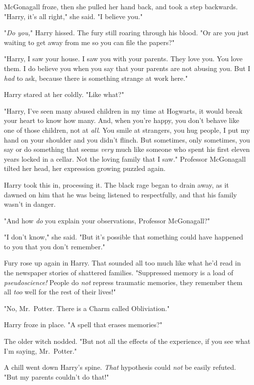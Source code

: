 McGonagall froze, then she pulled her hand back, and took a step backwards.
"Harry, it's all right," she said. "I believe you."

"\emph{Do you,}" Harry hissed. The fury still roaring through his blood. "Or
are you just waiting to get away from me so you can file the papers?"

"Harry, I saw your house. I saw you with your parents. They love you. You love
them. I do believe you when you say that your parents are not abusing you. But
I \emph{had} to ask, because there is something strange at work here."

Harry stared at her coldly. "Like what?"

"Harry, I've seen many abused children in my time at Hogwarts, it would break
your heart to know how many. And, when you're happy, you don't behave like one
of those children, not at \emph{all}. You smile at strangers, you hug people, I
put my hand on your shoulder and you didn't flinch. But sometimes, only
sometimes, you say or do something that seems \emph{very} much like{\el}
someone who spent his first eleven years locked in a cellar. Not the loving
family that I saw." Professor McGonagall tilted her head, her expression
growing puzzled again.

Harry took this in, processing it. The black rage began to drain away, as it
dawned on him that he was being listened to respectfully, and that his family
wasn't in danger.

"And how \emph{do} you explain your observations, Professor McGonagall?"

"I don't know," she said. "But it's possible that something could have happened
to you that you don't remember."

Fury rose up again in Harry. That sounded all too much like what he'd read in
the newspaper stories of shattered families. "Suppressed memory is a load of
\emph{pseudoscience!} People do \emph{not} repress traumatic memories, they
remember them all \emph{too} well for the rest of their lives!"

"No, Mr.~Potter. There is a Charm called Obliviation."

Harry froze in place. "A spell that erases memories?"

The older witch nodded. "But not all the effects of the experience, if you see
what I'm saying, Mr.~Potter."

A chill went down Harry's spine. \emph{That} hypothesis{\el} could
\emph{not} be easily refuted. "But my parents couldn't do that!"

